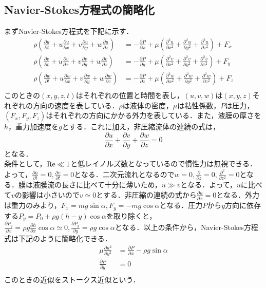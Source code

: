 \documentclass[autodetect-engine,dvipdfmx-if-dvi,ja=standard,a4paper,11pt]{bxjsarticle} %
\begin{document}
\subsection{Navier-Stokes方程式の簡略化}
まずNavier-Stokes方程式を下記に示す．
\begin{equation}
\begin{split}
\rho \left(\frac{\partial u}{\partial t}+u\frac{\partial u}{\partial x}+v\frac{\partial u}{\partial y}+w\frac{\partial u}{\partial z}\right)&=-\frac{\partial P}{\partial x}+\mu \left(\frac{\partial ^2u}{\partial x^2}+\frac{\partial^2 u}{\partial y^2}+\frac{\partial^2 u}{\partial z^2}\right)+F_x\\
\rho \left(\frac{\partial v}{\partial t}+u\frac{\partial v}{\partial x}+v\frac{\partial v}{\partial y}+w\frac{\partial v}{\partial z}\right)&=-\frac{\partial P}{\partial y}+\mu \left(\frac{\partial ^2v}{\partial x^2}+\frac{\partial ^2v}{\partial y^2}+\frac{\partial ^2v}{\partial z^2}\right)+F_y\\
\rho \left(\frac{\partial w}{\partial t}+u\frac{\partial w}{\partial x}+v\frac{\partial w}{\partial y}+w\frac{\partial w}{\partial z}\right)&=-\frac{\partial P}{\partial z}+\mu \left(\frac{\partial ^2w}{\partial x^2}+\frac{\partial ^2w}{\partial y^2}+\frac{\partial ^2w}{\partial z^2}\right)+F_z\\
\end{split}
\end{equation}
このときの$(x,y,z,t)$はそれぞれの位置と時間を表し，$(u,v,w)$は$(x,y,z)$それぞれの方向の速度を表している．$\rho$は液体の密度，$\mu$は粘性係数，$P$は圧力，$(F_x,F_y,F_z)$はそれぞれの方向にかかる外力を表している．また，液膜の厚さを$h$，重力加速度を$g$とする．これに加え，非圧縮流体の連続の式は，
\begin{equation}
\frac{\partial u}{\partial x}+\frac{\partial v}{\partial y}+\frac{\partial w}{\partial z}=0
\label{eq:mass}
\end{equation}
となる．\\
\　条件として，${\rm Re}\ll1$と低レイノルズ数となっているので慣性力は無視できる．よって，$\frac{\partial u}{\partial t}=0,\frac{\partial v}{\partial t}=0$となる．二次元流れとなるので$w=0,\frac{\partial }{\partial z}=0,\frac{\partial ^2}{\partial z^2}=0$となる．膜は液膜流の長さに比べて十分に薄いため，$u\gg v$となる．よって，$u$に比べて$v$の影響は小さいので$v\simeq 0$とする．非圧縮の連続の式から$\frac{\partial u}{\partial x}=0$となる．外力は重力のみより，$F_x=mg\sin\alpha,F_y=-mg\cos\alpha$となる．圧力$P$から$y$方向に依存する$P_y=P_0+\rho g(h-y)\cos\alpha$を取り除くと，$\frac{\partial P_y}{\partial x}=\rho g\frac{\partial h}{\partial x}\cos\alpha\simeq0,\frac{\partial P_y}{\partial y}=\rho g\cos\alpha$となる．以上の条件から，Navier-Stokes方程式は下記のように簡略化できる．
\begin{equation}
\begin{split}
\mu\frac{\partial u^2}{\partial y^2}&=\frac{\partial P}{\partial x}-\rho g\sin\alpha\\
\frac{\partial P}{\partial y}&=0\\
\end{split}
\label{eq:simple}
\end{equation}
このときの近似をストークス近似という．
\end{document}
